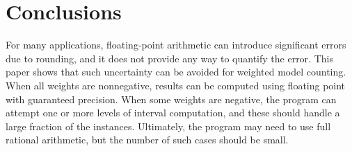\documentclass[letterpaper,USenglish,cleveref, autoref, thm-restate]{lipics-v2021}
\begin{document}


\section{Conclusions}
\label{sect:conclusion}

For many applications, floating-point arithmetic can introduce
significant errors due to rounding, and it does not provide any way to quantify the error.
This
paper shows that such uncertainty can be avoided for weighted model
counting.  When all weights are nonnegative, results can be computed
using floating point with guaranteed precision.  When some weights
are negative, the program can attempt one or more levels of interval
computation, and these should handle a large fraction of the instances.  Ultimately,
the program may need to use full rational arithmetic, but the number
of such cases should be small.

\end{document}

